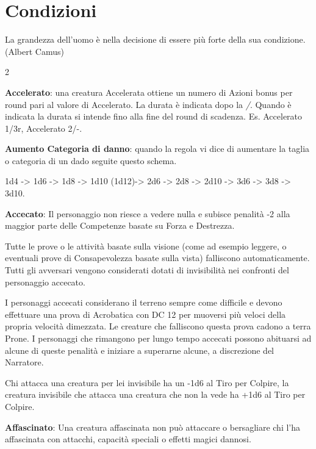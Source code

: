 \section{Condizioni}

\begin{enfasi}
La grandezza dell'uomo è nella decisione di essere più forte della sua condizione. (Albert Camus)
\end{enfasi}

\begin{multicols}{2}

\label{condizioni}

\textbf{Accelerato}\hypertarget{Accelerato}{}\label{Accelerato}: una creatura Accelerata ottiene un numero di Azioni bonus per round pari al valore di Accelerato. La durata è indicata dopo la \emph{/}. Quando è indicata la durata si intende fino alla fine del round di scadenza. Es. Accelerato 1/3r, Accelerato 2/-.

\textbf{Aumento Categoria di danno}: quando la regola vi dice di aumentare la taglia o categoria di un dado seguite questo schema.

1d4 -> 1d6 -> 1d8 -> 1d10 (1d12)-> 2d6 -> 2d8 -> 2d10 -> 3d6 -> 3d8 -> 3d10.

\textbf{Accecato}: Il personaggio non riesce a vedere nulla e subisce penalità -2 alla maggior parte delle Competenze basate su Forza e Destrezza.

Tutte le prove o le attività basate sulla visione (come ad esempio leggere, o eventuali prove di Consapevolezza basate sulla vista) falliscono automaticamente. Tutti gli avversari vengono considerati dotati di invisibilità nei confronti del personaggio accecato.

I personaggi accecati considerano il terreno sempre come difficile e devono effettuare una prova di Acrobatica con DC 12 per muoversi più veloci della propria velocità dimezzata. Le creature che falliscono questa prova cadono a terra Prone. I personaggi che rimangono per lungo tempo accecati possono abituarsi ad alcune di queste penalità e iniziare a superarne alcune, a discrezione del Narratore.

Chi attacca una creatura per lei invisibile ha un -1d6 al Tiro per Colpire, la creatura invisibile che attacca una creatura che non la vede ha +1d6 al Tiro per Colpire.

\textbf{Affascinato}: Una creatura affascinata non può attaccare o bersagliare chi l'ha affascinata con attacchi, capacità speciali o effetti magici dannosi.


\end{multicols}

